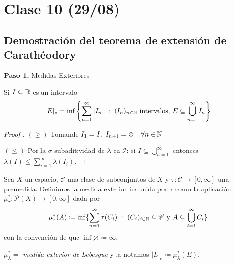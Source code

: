\section{Clase 10 (29/08)}

\subsection*{Demostración del teorema de extensión de Carathéodory}

\textbf{Paso 1:} Medidas Exteriores

\begin{prop}
	Si $I \subseteq \mathbb{R}$ es un intervalo,
	\[ |E|_{e} = \inf \left\{ \sum_{n=1}^{\infty} |I_n| \ : \  (I_n)_{n\in\mathbb{N}} \text{ intervalos, } E \subseteq \bigcup_{n=1}^{\infty} I_n \right\} \]
\end{prop}
\begin{proof}[Proof ]
	\text{} \par
	\noindent $(\geq)$ Tomando $I_1 = I,\ I_{n+1} = \varnothing \quad \forall n \in \mathbb{N}$ \par
	\medskip
	\noindent $(\leq)$ Por la $\sigma$-subaditividad de $\lambda$ en $\mathcal{I}$: si $I\subseteq \bigcup_{n=1}^{\infty}$ entonces $\lambda(I) \leq \sum_{i=1}^{\infty} \lambda(I_i)$.
\end{proof}

\begin{definition}
	Sea $X$ un espacio, $\mathscr{C}$ una clase de subconjuntos de $X$ y $\tau : \mathscr{C} \to [0,\infty]$ una premedida. Definimos la \underline{medida exterior inducida por $\tau$} como la aplicación $\mu_{\tau}^{*} : \mathscr{P}(X) \to [0,\infty]$ dada por
	\[ \mu_{\tau}^{*}(A) \coloneq \inf \{ \sum_{n=1}^{\infty} \tau(C_i) \ : \ (C_i)_{i\in\mathbb{N}} \subseteq \mathscr{C} \text{ y } A \subseteq \bigcup_{i=1}^{\infty} C_i \} \]
	con la convención de que $\inf \varnothing \coloneq \infty$.
\end{definition}

\begin{eg}
	$\mu_{\lambda}^{*} =$ \textit{medida exterior de Lebesgue} y la notamos $|E|_e \coloneq \mu_{\lambda}^{*}(E)$.
\end{eg}

